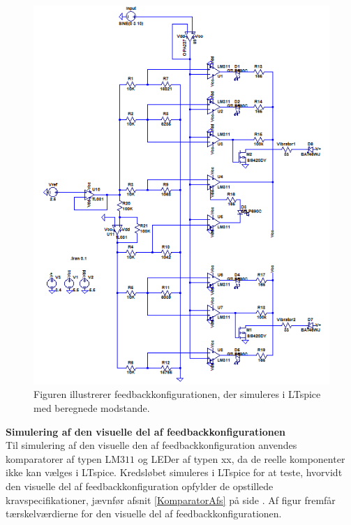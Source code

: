 \begin{figure}[H]
	\centering
	\includegraphics[scale=0.3]{figures/cProblemloesning/komparator_samlet.PNG}
	\caption{Figuren illustrerer feedbackkonfigurationen, der simuleres i LTspice med beregnede modstande.}
	\label{fig:komparator_samlet}
\end{figure}
 
\noindent\textbf{Simulering af den visuelle del af feedbackkonfigurationen} \\
Til simulering af den visuelle den af feedbackkonfiguration anvendes komparatorer af typen LM$311$ og LEDer af typen xx, da de reelle komponenter ikke kan vælges i LTspice. Kredsløbet simuleres i LTspice for at teste, hvorvidt den visuelle del af feedbackkonfiguration opfylder de opstillede kravspecifikationer, jævnfør afsnit \ref{KomparatorAfs} på side \pageref{KomparatorAfs}. Af figur  fremfår tærskelværdierne for den visuelle del af feedbackkonfigurationen. 



